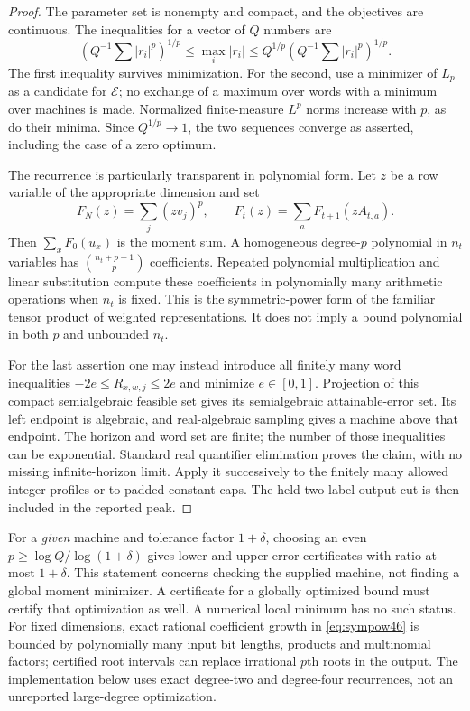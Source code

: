 \begin{proof}
The parameter set is nonempty and compact, and the objectives are
continuous. The inequalities for a vector of $Q$ numbers are
\[
 \left(Q^{-1}\sum |r_i|^p\right)^{1/p}
 \le\max_i|r_i|\le
 Q^{1/p}\left(Q^{-1}\sum |r_i|^p\right)^{1/p}.
\]
The first inequality survives minimization. For the second, use a
minimizer of $L_p$ as a candidate for $\mathcal E$; no exchange of a
maximum over words with a minimum over machines is made. Normalized
finite-measure $L^p$ norms increase with $p$, as do their minima.
Since $Q^{1/p}\to1$, the two sequences converge as asserted, including
the case of a zero optimum.

The recurrence is particularly transparent in polynomial form. Let
$z$ be a row variable of the appropriate dimension and set
\begin{equation}\label{eq:sympow46}
 F_N(z)=\sum_j(zv_j)^p,\qquad
 F_t(z)=\sum_a F_{t+1}(zA_{t,a}).
\end{equation}
Then $\sum_xF_0(u_x)$ is the moment sum. A homogeneous degree-$p$
polynomial in $n_t$ variables has $\binom{n_t+p-1}{p}$ coefficients.
Repeated polynomial multiplication and linear substitution compute
these coefficients in polynomially many arithmetic operations when
$n_t$ is fixed. This is the symmetric-power form of the familiar tensor
product of weighted representations. It does not imply a bound
polynomial in both $p$ and unbounded $n_t$.

For the last assertion one may instead introduce all finitely many
word inequalities $-2e\le R_{x,w,j}\le2e$ and minimize $e\in[0,1]$.
Projection of this compact semialgebraic feasible set gives its
semialgebraic attainable-error set. Its left endpoint is algebraic,
and real-algebraic sampling gives a machine above that endpoint.
The horizon and word set are finite; the number of those inequalities
can be exponential. Standard real quantifier elimination proves the
claim, with no missing infinite-horizon limit. Apply it successively
to the finitely many allowed integer profiles or to padded constant
caps. The held two-label output cut is then included in the reported
peak.\qedhere
\end{proof}

For a \emph{given} machine and tolerance factor $1+\delta$, choosing
an even $p\ge\log Q/\log(1+\delta)$ gives lower and upper error
certificates with ratio at most $1+\delta$. This statement concerns
checking the supplied machine, not finding a global moment minimizer.
A certificate for a globally optimized bound must certify that
optimization as well. A numerical local minimum has no such status.
For fixed dimensions, exact rational coefficient growth in
\eqref{eq:sympow46} is bounded by polynomially many input bit lengths,
products and multinomial factors; certified root intervals can replace
irrational $p$th roots in the output. The implementation below uses
exact degree-two and degree-four recurrences, not an unreported
large-degree optimization.


